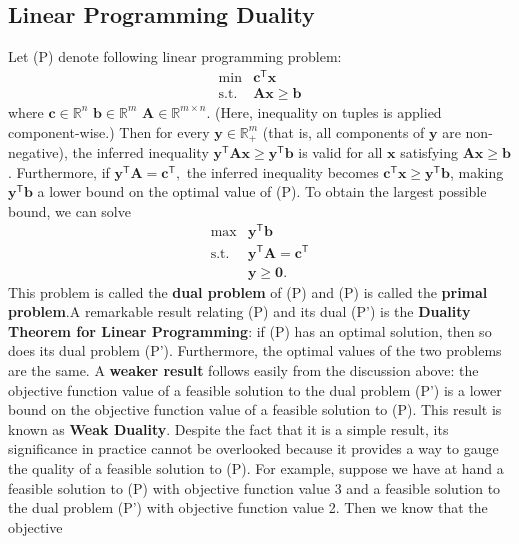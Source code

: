 \subsection{Linear Programming
Duality}
Let (P) denote following linear programming problem:
\[\begin{array}{rl}
\min & \mathbf{c}^\mathsf{T} \mathbf{x} \\
\mbox{s.t.} & \mathbf{A}\mathbf{x} \geq \mathbf{b}
\end{array}\] where \(\mathbf{c} \in \mathbb{R}^n\)
\(\mathbf{b} \in \mathbb{R}^m\)
\(\mathbf{A} \in \mathbb{R}^{m\times n}.\) (Here, inequality on tuples
is applied component-wise.) Then for every
\(\mathbf{y} \in \mathbb{R}^m_+\) (that is, all components of
\(\mathbf{y}\) are non-negative), the inferred inequality
\(\mathbf{y}^\mathsf{T}\mathbf{A}\mathbf{x} \geq \mathbf{y}^\mathsf{T} \mathbf{b}\)
is valid for all \(\mathbf{x}\) satisfying
\(\mathbf{A}\mathbf{x} \geq \mathbf{b}\). Furthermore, if
\(\mathbf{y}^\mathsf{T}\mathbf{A} = \mathbf{c}^\mathsf{T},\) the
inferred inequality becomes
\(\mathbf{c}^\mathsf{T} \mathbf{x} \geq  \mathbf{y}^\mathsf{T} \mathbf{b}\),
making \(\mathbf{y}^\mathsf{T} \mathbf{b}\) a lower bound on the optimal
value of (P). To obtain the largest possible bound, we can solve
\[\begin{array}{rl}
\max & \mathbf{y}^\mathsf{T} \mathbf{b} \\
\mbox{s.t.} & \mathbf{y}^\mathsf{T} \mathbf{A} = \mathbf{c}^\mathsf{T} \\
& \mathbf{y} \geq \mathbf{0}.
\end{array}\] This problem is called the \textbf{dual problem} of (P) and
(P) is called the \textbf{primal problem}.\newl A remarkable result relating
(P) and its dual (P') is the \textbf{Duality Theorem for Linear Programming}: if (P) has an optimal solution, then so does its dual 
problem (P'). Furthermore, the optimal values of the two problems are the
same.
\newl A \textbf{weaker result} follows easily from the discussion above: the objective function value of a feasible solution to
the dual problem (P') is a lower bound on the objective function value of a
feasible solution to (P).
\newl This result is known as \textbf{Weak Duality}. Despite the fact that it is a
simple result, its significance in practice cannot be overlooked because
it provides a way to gauge the quality of a feasible solution to (P). For example, suppose we have at hand a feasible solution to (P) with
objective function value 3 and a feasible solution to the dual problem (P') 
with objective function value 2. Then we know that the objective
